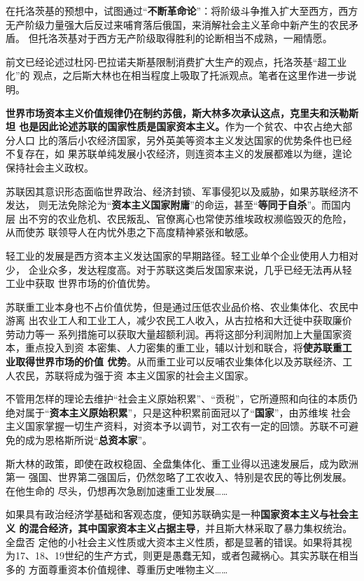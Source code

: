 在托洛茨基的预想中，试图通过“\textbf{不断革命论}”：将阶级斗争推入扩大至西方，西方
无产阶级力量强大后反过来哺育落后俄国，来消解社会主义革命中新产生的农民矛盾。
但托洛茨基对于西方无产阶级取得胜利的论断相当不成熟，一厢情愿。

前文已经论述过杜冈-巴拉诺夫斯基限制消费扩大生产的观点，托洛茨基“超工业化”的
观点，之后斯大林也在相当程度上吸取了托派观点。笔者在这里作进一步说明。

\textbf{世界市场资本主义价值规律仍在制约苏俄，斯大林多次承认这点，克里夫和沃勒斯坦
  也是因此论述苏联的国家性质是国家资本主义。}作为一个贫农、中农占绝大部分人口
比的落后小农经济国家，另外英美等资本主义发达国家的优势条件也已经不复存在，如
果苏联单纯发展小农经济，则连资本主义的发展都难以为继，遑论保持社会主义政权。

苏联因其意识形态面临世界政治、经济封锁、军事侵犯以及威胁，如果苏联经济不发达，
则无法免除沦为“\textbf{资本主义国家附庸}”的命运，甚至“\textbf{等同于自杀}”。而国内层
出不穷的农业危机、农民叛乱、官僚离心也常使苏维埃政权濒临毁灭的危险，从而使苏
联领导人在内忧外患之下高度精神紧张和敏感。

轻工业的发展是西方资本主义发达国家的早期路径。轻工业单个企业使用人力相对少，
企业众多，发达程度高。对于苏联这类后发国家来说，几乎已经无法再从轻工业中获取
世界市场的价值优势。

苏联重工业本身也不占价值优势，但是通过压低农业品价格、农业集体化、农民中游离
出农业工人和工业工人，减少农民工人收入，从古拉格和大迁徙中获取廉价劳动力等一
系列措施可以获取大量超额利润。再将这部分利润附加上大量国家资本，重点投入到资
本密集、人力密集的重工业，辅以计划和联合，将\textbf{使苏联重工业取得世界市场的价值
  优势}。从而重工业可以反哺农业集体化以及苏联经济、工人农民，苏联将成为强于资
本主义国家的社会主义国家。

不管用怎样的理论去维护“社会主义原始积累”、“贡税”，它所遵照和向往的本质仍
绝对属于“\textbf{资本主义原始积累}”，只是这种积累前面冠以了“\textbf{国家}”，由苏维埃
社会主义国家掌握一切生产资料，对资本予以调节，对工农有一定的回馈。苏联不可避
免的成为恩格斯所说“\textbf{总资本家}”。

斯大林的政策，即使在政权稳固、全盘集体化、重工业得以迅速发展后，成为欧洲第一
强国、世界第二强国后，仍然忽略了工农收入、特别是农民的等比例发展。在他生命的
尽头，仍想再次急剧加速重工业发展……

如果具有政治经济学基础和客观态度，便知苏联确实是一种\textbf{国家资本主义与社会主义
  的混合经济，其中国家资本主义占据主导}，并且斯大林采取了暴力集权统治。全盘否
定他的小社会主义性质或大资本主义性质，都是显著的错误。如果将其视
为17、18、19世纪的生产方式，则更是愚蠢无知，或者包藏祸心。其实苏联在相当多的
方面尊重资本价值规律、尊重历史唯物主义……

